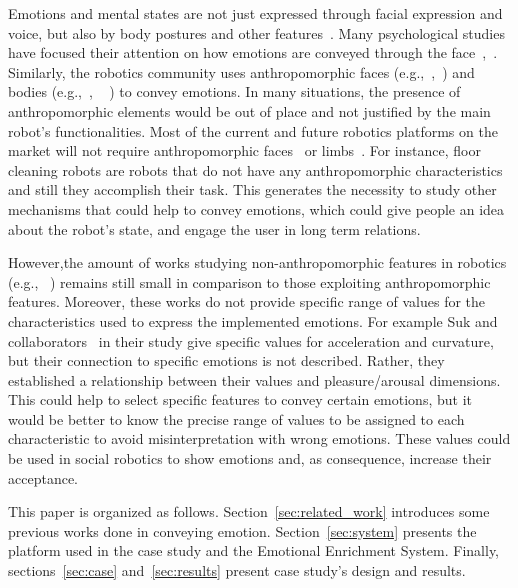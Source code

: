Emotions and mental states are not just expressed through facial expression and voice, but also by body postures and other features~\cite{Gelder2008}. Many psychological studies have focused their attention on how emotions are conveyed through the face~\cite{Ekman2004},~\cite{kleinsmith2012affective}. Similarly, the robotics community uses anthropomorphic faces (e.g.,~\cite{Arras2012},~\cite{Breazeal2002}) and bodies (e.g.,~\cite{Canamero2010},
~\cite{Destephe2013}
) to convey emotions.
In many situations, the presence of anthropomorphic elements would be out of place and not justified by the main robot's functionalities. Most of the current and future robotics platforms on the market will not require anthropomorphic faces~\cite{Breazeal2002} or limbs~\cite{Li2011}. For instance, floor cleaning robots are robots that do not have any anthropomorphic characteristics and still they accomplish their task.
This generates the necessity to study other mechanisms that could help to convey emotions, which could give people an idea about the robot's state, and engage the user in long term relations.

However,the amount of works studying non-anthropomorphic features in robotics (e.g.,~\cite{Saerbeck2010}
) remains still small in comparison to those exploiting anthropomorphic features. Moreover, these works do not provide specific range of values for the characteristics used to express the implemented emotions. For example Suk and collaborators~\cite{NAM2014} in their study give specific values for acceleration and curvature, but their connection to specific emotions is not described. Rather, they established a relationship between their values and pleasure/arousal dimensions. This could help to select specific features to convey certain emotions, but it would be better to know the precise range of values to be assigned to each characteristic to avoid misinterpretation with wrong emotions. These values could be used in social robotics to show emotions and, as consequence, increase their acceptance.

This paper is organized as follows. Section~\ref{sec:related_work} introduces some previous works done in conveying emotion. Section~\ref{sec:system} presents the platform used in the case study and the Emotional Enrichment System. Finally, sections~\ref{sec:case} and~\ref{sec:results} present case study's design and results.
